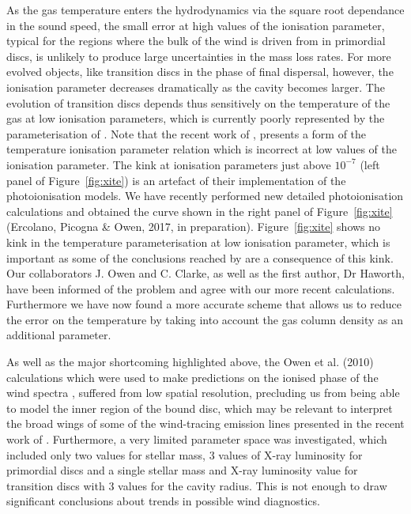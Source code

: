 \documentclass[10pt,fleqn,twoside]{article}
\begin{document}
As the gas temperature enters the hydrodynamics via the square root
dependance in the sound speed, the small error at high values of the
ionisation parameter, typical for the regions where the bulk of the
wind is driven from in primordial discs, is unlikely to produce large
uncertainties in the mass loss rates. For more evolved objects, like
transition discs in the phase of final dispersal, however, the ionisation
parameter decreases dramatically as the cavity becomes larger. The
evolution of transition discs depends thus sensitively on the temperature
of the gas at low ionisation parameters, which is currently poorly
represented by the parameterisation of 
\citet{2008ApJ...688..398E, 2009ApJ...699.1639E}.
Note that the recent work of 
\citet{2016MNRAS.457.1905H},
presents a form of the temperature ionisation parameter relation which is incorrect at
low values of the ionisation parameter. The kink at ionisation
parameters just above $10^{-7}$ (left panel of Figure~\ref{fig:xite}) is an artefact of their implementation
of the photoionisation models. We have recently performed new detailed
photoionisation calculations and obtained the curve shown in the right
panel of Figure~\ref{fig:xite} (Ercolano, Picogna \& Owen, 2017, in preparation).
Figure~\ref{fig:xite} shows no kink in the temperature parameterisation at
low ionisation parameter, which is important as some of the
conclusions reached by
\citet{2016MNRAS.457.1905H} are a consequence of this kink.  Our
collaborators J. Owen and C. Clarke, as well as the first author, Dr Haworth, have been informed of the problem
and agree with our more recent calculations. Furthermore we have now
found a more accurate scheme that allows us to reduce the error on the
temperature by taking into account the gas column density as an additional
parameter. 

As well as the major shortcoming highlighted above, the Owen et
al. (2010) calculations which were used to make predictions on
the ionised phase of the wind spectra 
\citep{2010MNRAS.406.1553E, 2016MNRAS.460.3472E},
suffered from low spatial resolution,
precluding us from being able to model the inner region of the bound disc, which
may be relevant to interpret the broad wings of some of the
wind-tracing emission lines presented in the recent
work of 
\citet{2016ApJ...831..169S}.
Furthermore, a very limited
parameter space was investigated, which included only two values for
stellar mass, 3 values of X-ray luminosity for primordial discs and a
single stellar mass and X-ray luminosity value for transition discs
with 3 values for the cavity radius. This is not enough to draw 
significant conclusions about trends in possible wind diagnostics. 
\end{document}
